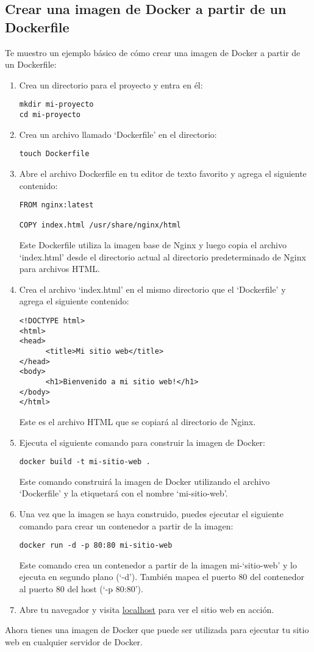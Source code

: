 \documentclass{article}
\begin{document}
\subsection{Crear una imagen de Docker a partir de un Dockerfile}
Te muestro un ejemplo básico de cómo crear una imagen de Docker a partir de un Dockerfile:
\begin{enumerate}
      \item Crea un directorio para el proyecto y entra en él:
\begin{lstlisting}
mkdir mi-proyecto
cd mi-proyecto\end{lstlisting}
      \item Crea un archivo llamado \enquote*{Dockerfile} en el directorio:
\begin{lstlisting}
touch Dockerfile
\end{lstlisting}
      \item Abre el archivo Dockerfile en tu editor de texto favorito y agrega el siguiente contenido:
\begin{lstlisting}[numbers=none]
FROM nginx:latest

COPY index.html /usr/share/nginx/html
\end{lstlisting}
Este Dockerfile utiliza la imagen base de Nginx y luego copia el archivo \enquote*{index.html} desde el directorio actual al directorio predeterminado de Nginx para archivos HTML.
      \item Crea el archivo \enquote*{index.html} en el mismo directorio que el \enquote*{Dockerfile} y agrega el siguiente contenido:
\begin{lstlisting}[numbers=none]
<!DOCTYPE html>
<html>
<head>
      <title>Mi sitio web</title>
</head>
<body>
      <h1>Bienvenido a mi sitio web!</h1>
</body>
</html>      
\end{lstlisting}
Este es el archivo HTML que se copiará al directorio de Nginx.
      \item Ejecuta el siguiente comando para construir la imagen de Docker:
\begin{lstlisting}
docker build -t mi-sitio-web .
\end{lstlisting}
Este comando construirá la imagen de Docker utilizando el archivo \enquote*{Dockerfile} y la etiquetará con el nombre \enquote*{mi-sitio-web}.
      \item Una vez que la imagen se haya construido, puedes ejecutar el siguiente comando para crear un contenedor a partir de la imagen:
\begin{lstlisting}
docker run -d -p 80:80 mi-sitio-web
\end{lstlisting}
Este comando crea un contenedor a partir de la imagen mi-\enquote*{sitio-web} y lo ejecuta en segundo plano (\enquote*{-d}). También mapea el puerto 80 del contenedor al puerto 80 del host (\enquote*{-p 80:80}).
      \item Abre tu navegador y visita \href{http://localhost}{localhost} para ver el sitio web en acción.
\end{enumerate}
Ahora tienes una imagen de Docker que puede ser utilizada para ejecutar tu sitio web en cualquier servidor de Docker.
\end{document}
